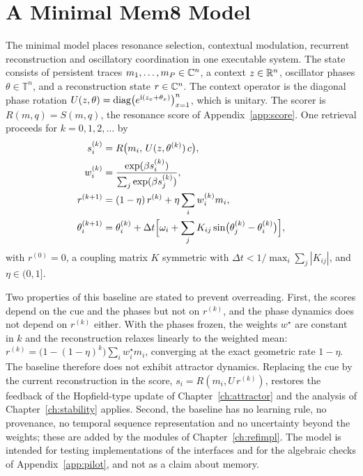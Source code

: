 \chapter{A Minimal Mem8 Model}\label{app:minimal}

The minimal model places resonance selection, contextual modulation, recurrent reconstruction and oscillatory coordination in one executable system. The state consists of persistent traces $m_1,\dots,m_P\in\mathbb{C}^n$, a context $z\in\mathbb{R}^n$, oscillator phases $\theta\in\mathbb T^n$, and a reconstruction state $r\in\mathbb{C}^n$. The context operator is the diagonal phase rotation $U(z,\theta)=\operatorname{diag}\bigl(e^{\mathrm{i}(z_x+\theta_x)}\bigr)_{x=1}^n$, which is unitary. The scorer is $R(m,q)=S(m,q)$, the resonance score of Appendix~\ref{app:score}. One retrieval proceeds for $k=0,1,2,\dots$ by
\begin{align}
s_i^{(k)}&=R\bigl(m_i,\,U(z,\theta^{(k)})\,c\bigr),\\
w_i^{(k)}&=\frac{\exp(\beta s_i^{(k)})}{\sum_j\exp(\beta s_j^{(k)})},\\
r^{(k+1)}&=(1-\eta)\,r^{(k)}+\eta\sum_iw_i^{(k)}m_i,\\
\theta_i^{(k+1)}&=\theta_i^{(k)}+\Delta t\Bigl[\omega_i+\sum_jK_{ij}\sin\bigl(\theta_j^{(k)}-\theta_i^{(k)}\bigr)\Bigr],
\end{align}
with $r^{(0)}=0$, a coupling matrix $K$ symmetric with $\Delta t<1/\max_i\sum_j|K_{ij}|$, and $\eta\in(0,1]$.

Two properties of this baseline are stated to prevent overreading. First, the scores depend on the cue and the phases but not on $r^{(k)}$, and the phase dynamics does not depend on $r^{(k)}$ either. With the phases frozen, the weights $w^\star$ are constant in $k$ and the reconstruction relaxes linearly to the weighted mean: $r^{(k)}=\bigl(1-(1-\eta)^k\bigr)\sum_iw_i^\star m_i$, converging at the exact geometric rate $1-\eta$. The baseline therefore does not exhibit attractor dynamics. Replacing the cue by the current reconstruction in the score, $s_i=R(m_i,U\,r^{(k)})$, restores the feedback of the Hopfield-type update of Chapter~\ref{ch:attractor} and the analysis of Chapter~\ref{ch:stability} applies. Second, the baseline has no learning rule, no provenance, no temporal sequence representation and no uncertainty beyond the weights; these are added by the modules of Chapter~\ref{ch:refimpl}. The model is intended for testing implementations of the interfaces and for the algebraic checks of Appendix~\ref{app:pilot}, and not as a claim about memory.

